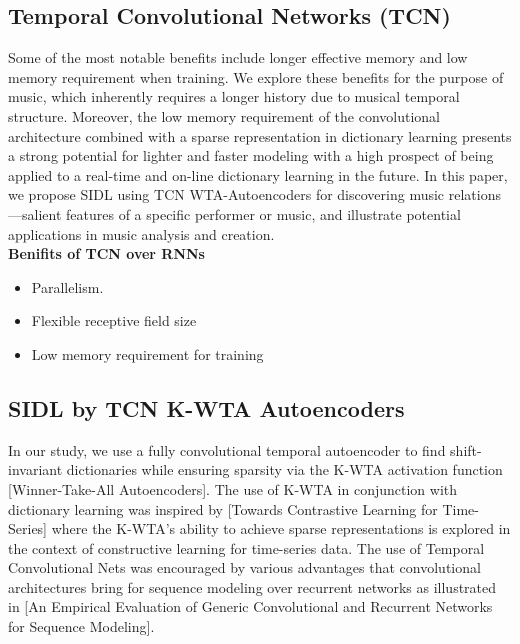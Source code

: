 \documentclass[11pt,a4paper]{article}
\begin{document}
\subsection{Temporal Convolutional Networks (TCN) }
 Some of the most notable benefits include longer effective memory and low memory requirement when training. We explore these benefits for the purpose of music, which inherently requires a longer history due to musical temporal structure. Moreover, the low memory requirement of the convolutional architecture combined with a sparse representation in dictionary learning presents a strong potential for lighter and faster modeling with a high prospect of being applied to a real-time and on-line dictionary learning in the future. In this paper, we propose SIDL using TCN WTA-Autoencoders for discovering music relations—salient features of a specific performer or music, and illustrate potential applications in music analysis and creation. 
\\
\textbf{Benifits of TCN over RNNs  \citep{Gusfield:97}} 
\begin{itemize}
\item Parallelism.  
\item Flexible receptive field size
\item Low memory requirement for training
\end{itemize}


\subsection{SIDL by TCN K-WTA Autoencoders}

In our study, we use a fully convolutional temporal autoencoder to find shift-invariant dictionaries while ensuring sparsity via the K-WTA activation function [Winner-Take-All Autoencoders]. The use of K-WTA in conjunction with dictionary learning was inspired by [Towards Contrastive Learning for Time-Series] where the K-WTA’s ability to achieve sparse representations is explored in the context of constructive learning for time-series data. The use of Temporal Convolutional Nets was encouraged by various advantages that convolutional architectures bring for sequence modeling over recurrent networks as illustrated in [An Empirical Evaluation of Generic Convolutional and Recurrent Networks for Sequence Modeling].
\end{document}
